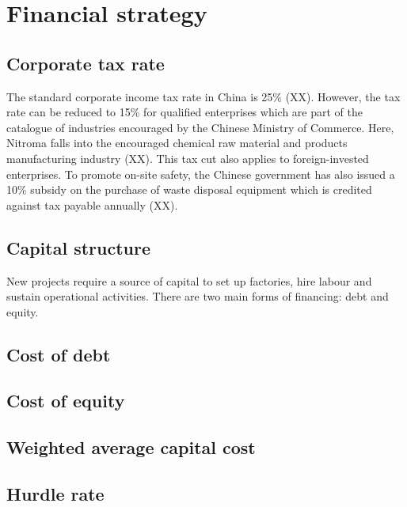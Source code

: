 \section{Financial strategy}
\subsection{Corporate tax rate}
The standard corporate income tax rate in China is 25\% (XX). However, the tax rate can be reduced to 15\% for qualified enterprises which are part of the catalogue of industries encouraged by the Chinese Ministry of Commerce. Here, Nitroma falls into the encouraged chemical raw material and products manufacturing industry (XX). This tax cut also applies to foreign-invested enterprises. To promote on-site safety, the Chinese government has also issued a 10\% subsidy on the purchase of waste disposal equipment which is credited against tax payable annually (XX).

\subsection{Capital structure}
New projects require a source of capital to set up factories, hire labour and sustain operational activities. There are two main forms of financing: debt and equity. 

\subsection{Cost of debt}
\subsection{Cost of equity}
\subsection{Weighted average capital cost}
\subsection{Hurdle rate}